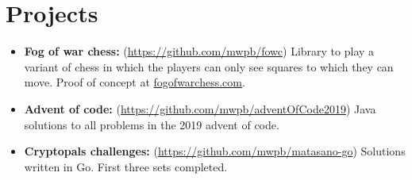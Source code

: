 \documentclass[11pt]{article}
\begin{document}
\section*{Projects}
\label{sec:org641a1ff}

\begin{itemize}
\item \textbf{Fog of war chess:} (\url{https://github.com/mwpb/fowc}) Library to play a variant of chess in which the players can only see squares to which they can move. Proof of concept at \href{https:fogofwarchess.com}{fogofwarchess.com}.
\item \textbf{Advent of code:} (\url{https://github.com/mwpb/adventOfCode2019}) Java solutions to all problems in the 2019 advent of code.
\item \textbf{Cryptopals challenges:} (\url{https://github.com/mwpb/matasano-go}) Solutions written in Go. First three sets completed.
\end{itemize}
\end{document}
